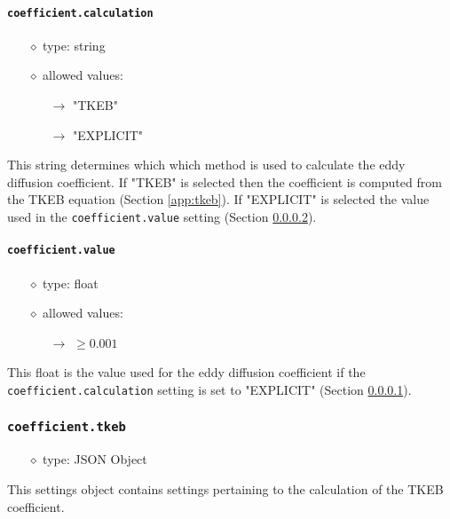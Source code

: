 \documentclass[]{article}
\def\code#1{\texttt{#1}}
\begin{document}
\paragraph{\code{coefficient.calculation}}\label{sec:coeffcalc}
\begin{itemize}
    \item[$\diamond$] type: string 
    \item[$\diamond$] allowed values:
    \begin{itemize}
        \item[$\rightarrow$] "TKEB"
        \item[$\rightarrow$] "EXPLICIT"
    \end{itemize}
\end{itemize}
This string determines which which method is used to calculate the eddy
diffusion coefficient. If "TKEB" is selected then the coefficient is computed
from the TKEB equation (Section \ref{app:tkeb}). If "EXPLICIT" is selected 
the value used in the \code{coefficient.value} setting
(Section \ref{sec:coeffvalue}).


\paragraph{\code{coefficient.value}}\label{sec:coeffvalue}
\begin{itemize}
    \item[$\diamond$] type: float 
    \item[$\diamond$] allowed values:
    \begin{itemize}
        \item[$\rightarrow$] $\geq0.001$
    \end{itemize}
\end{itemize}
This float is the value used for the eddy diffusion coefficient if the
\code{coefficient.calculation} setting is set to
"EXPLICIT" (Section \ref{sec:coeffcalc}).

\subsubsection{\code{coefficient.tkeb}}\label{sec:coefftkeb}
\begin{itemize}
    \item[$\diamond$] type: JSON Object 
\end{itemize}
This settings object contains settings pertaining to the calculation of the TKEB
coefficient.
\end{document}
